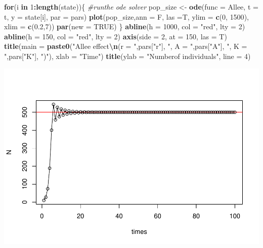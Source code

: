 \documentclass[
]{book}
\newenvironment{Shaded}{\begin{snugshade}}{\end{snugshade}}
\newcommand{\AttributeTok}[1]{\textcolor[rgb]{0.13,0.29,0.53}{#1}}
\newcommand{\CommentTok}[1]{\textcolor[rgb]{0.56,0.35,0.01}{\textit{#1}}}
\newcommand{\ConstantTok}[1]{\textcolor[rgb]{0.56,0.35,0.01}{#1}}
\newcommand{\ControlFlowTok}[1]{\textcolor[rgb]{0.13,0.29,0.53}{\textbf{#1}}}
\newcommand{\DecValTok}[1]{\textcolor[rgb]{0.00,0.00,0.81}{#1}}
\newcommand{\FloatTok}[1]{\textcolor[rgb]{0.00,0.00,0.81}{#1}}
\newcommand{\FunctionTok}[1]{\textcolor[rgb]{0.13,0.29,0.53}{\textbf{#1}}}
\newcommand{\NormalTok}[1]{#1}
\newcommand{\OtherTok}[1]{\textcolor[rgb]{0.56,0.35,0.01}{#1}}
\newcommand{\SpecialCharTok}[1]{\textcolor[rgb]{0.81,0.36,0.00}{\textbf{#1}}}
\newcommand{\StringTok}[1]{\textcolor[rgb]{0.31,0.60,0.02}{#1}}
\begin{document}
\begin{Shaded}
\begin{Highlighting}[]
\ControlFlowTok{for}\NormalTok{(i }\ControlFlowTok{in} \DecValTok{1}\SpecialCharTok{:}\FunctionTok{length}\NormalTok{(state))\{}
  \CommentTok{\#runthe ode solver}
\NormalTok{  pop\_size }\OtherTok{\textless{}{-}} \FunctionTok{ode}\NormalTok{(}\AttributeTok{func =}\NormalTok{ Allee, }\AttributeTok{t =}\NormalTok{ t, }\AttributeTok{y =}\NormalTok{ state[i], }\AttributeTok{par =}\NormalTok{ pars)}
  \FunctionTok{plot}\NormalTok{(pop\_size,}\AttributeTok{ann =}\NormalTok{ F, }\AttributeTok{las =}\NormalTok{T, }\AttributeTok{ylim =} \FunctionTok{c}\NormalTok{(}\DecValTok{0}\NormalTok{, }\DecValTok{1500}\NormalTok{), }\AttributeTok{xlim =} \FunctionTok{c}\NormalTok{(}\FloatTok{0.2}\NormalTok{,}\DecValTok{7}\NormalTok{))}
  \FunctionTok{par}\NormalTok{(}\AttributeTok{new =} \ConstantTok{TRUE}\NormalTok{)}
\NormalTok{\}}
\FunctionTok{abline}\NormalTok{(}\AttributeTok{h =} \DecValTok{1000}\NormalTok{, }\AttributeTok{col =} \StringTok{"red"}\NormalTok{, }\AttributeTok{lty =} \DecValTok{2}\NormalTok{)}
\FunctionTok{abline}\NormalTok{(}\AttributeTok{h =} \DecValTok{150}\NormalTok{, }\AttributeTok{col =} \StringTok{"red"}\NormalTok{, }\AttributeTok{lty =} \DecValTok{2}\NormalTok{)}
\FunctionTok{axis}\NormalTok{(}\AttributeTok{side =} \DecValTok{2}\NormalTok{, }\AttributeTok{at =} \DecValTok{150}\NormalTok{, }\AttributeTok{las =}\NormalTok{ T)}
\FunctionTok{title}\NormalTok{(}\AttributeTok{main =} \FunctionTok{paste0}\NormalTok{(}\StringTok{"Allee effect}\SpecialCharTok{\textbackslash{}n}\StringTok{(r = "}\NormalTok{,pars[}\StringTok{"r"}\NormalTok{],}
                  \StringTok{", A = "}\NormalTok{,pars[}\StringTok{"A"}\NormalTok{],}
                  \StringTok{", K = "}\NormalTok{,pars[}\StringTok{"K"}\NormalTok{], }\StringTok{")"}\NormalTok{),}
      \AttributeTok{xlab =} \StringTok{"Time"}\NormalTok{)}
\FunctionTok{title}\NormalTok{(}\AttributeTok{ylab =} \StringTok{"Numberof individuals"}\NormalTok{, }\AttributeTok{line =} \DecValTok{4}\NormalTok{)}
\end{Highlighting}
\end{Shaded}

\includegraphics{bookdown-demo_files/figure-latex/unnamed-chunk-15-1.pdf}

  
\end{document}
